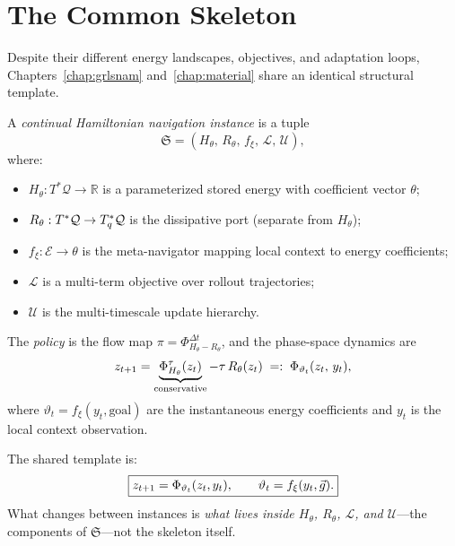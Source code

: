 \section{The Common Skeleton}
\label{sec:ch5:skeleton}

Despite their different energy landscapes, objectives, and adaptation
loops, Chapters~\ref{chap:grlsnam} and~\ref{chap:material} share an
identical structural template.

\begin{definition}
\label{def:ch5:skeleton}
A \emph{continual Hamiltonian navigation instance} is a tuple
\begin{equation}
  \mathfrak{S} = (H_\theta,\, R_\theta,\, f_\xi,\, \mathcal{L},\,
                  \mathcal{U}),
  \label{eq:ch5:skeleton_tuple}
\end{equation}
where:
\begin{itemize}
  \item $H_\theta : T^*\mathcal{Q} \to \mathbb{R}$ is a parameterized
        stored energy with coefficient vector $\theta$;
  \item $R_\theta : T^*\mathcal{Q} \to T^*_q\mathcal{Q}$ is the
        dissipative port (separate from $H_\theta$);
  \item $f_\xi : \mathcal{E} \to \theta$ is the meta-navigator mapping
        local context to energy coefficients;
  \item $\mathcal{L}$ is a multi-term objective over rollout trajectories;
  \item $\mathcal{U}$ is the multi-timescale update hierarchy.
\end{itemize}
The \emph{policy} is the flow map
$\pi = \Phi^{\Delta t}_{H_\theta - R_\theta}$,
and the phase-space dynamics are
\begin{equation}
  z_{t+1}
  = \underbrace{\Phi^{\tau}_{H_\theta}(z_t)}_{\text{conservative}}
  - \tau\,R_\theta(z_t)
  \;=:\; \Phi_{\vartheta_t}(z_t,\, y_t),
  \label{eq:ch5:skeleton_dynamics}
\end{equation}
where $\vartheta_t = f_\xi(y_t, \text{goal})$ are the instantaneous
energy coefficients and $y_t$ is the local context observation.
\end{definition}

The shared template is:
\begin{equation}
  \boxed{
  z_{t+1} = \Phi_{\vartheta_t}(z_t, y_t),
  \qquad
  \vartheta_t = f_\xi(y_t, \vec{g}).
  }
  \label{eq:ch5:template}
\end{equation}
What changes between instances is \emph{what lives inside $H_\theta$,
$R_\theta$, $\mathcal{L}$, and $\mathcal{U}$}—the components of
$\mathfrak{S}$—not the skeleton itself.

